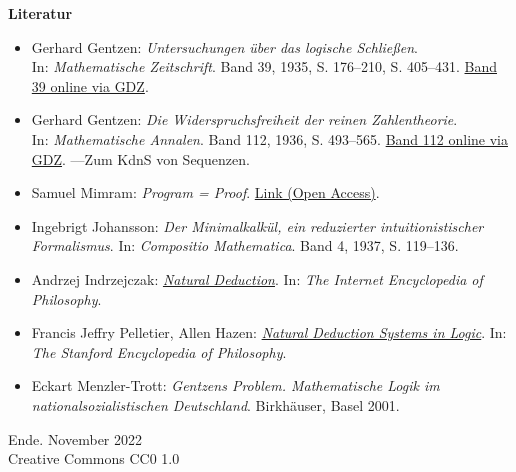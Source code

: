 \documentclass[8pt]{beamer}
\newcommand{\modest}[1]{{\small\color{gray}#1}}
\newcommand{\strong}[1]{\textsf{\textbf{#1}}}
\begin{document}
\begin{frame}[t]
\vspace{2em}
\strong{Literatur}
\begin{itemize}
\item Gerhard Gentzen: \emph{Untersuchungen über das logische Schließen}.\\
In: \emph{Mathematische Zeitschrift}. Band 39, 1935, S. 176--210, S. 405--431.
\href{https://gdz.sub.uni-goettingen.de/id/PPN266833020_0039}{Band 39 online via GDZ}.
\item Gerhard Gentzen: \emph{Die Widerspruchsfreiheit der reinen
Zahlentheorie}.\\
In: \emph{Mathematische Annalen}. Band 112, 1936, S. 493--565.
\href{https://gdz.sub.uni-goettingen.de/id/PPN235181684_0112}{Band 112 online via GDZ}.
---Zum KdnS von Sequenzen.
\item Samuel Mimram: \emph{Program = Proof}.
\href{https://www.lix.polytechnique.fr/Labo/Samuel.Mimram/publications/}{Link (Open Access)}.
\item Ingebrigt Johansson: \emph{Der Minimalkalkül, ein reduzierter
intuitionistischer Formalismus}. In: \emph{Compositio Mathematica}.
Band 4, 1937, S. 119--136.
\item Andrzej Indrzejczak: \href{https://iep.utm.edu/natural-deduction/}{\emph{Natural Deduction}}.
In: \emph{The Internet Encyclopedia of Philosophy}.
\item Francis Jeffry Pelletier, Allen Hazen:
\href{https://plato.stanford.edu/entries/natural-deduction/}{\emph{Natural Deduction Systems in Logic}}.
In: \emph{The Stanford Encyclopedia of Philosophy}.
\item Eckart Menzler-Trott: \emph{Gentzens Problem. Mathematische Logik
  im nationalsozialistischen Deutschland}. Birkhäuser, Basel 2001.
\end{itemize}
\end{frame}

\begin{frame}
Ende.
\vfill\hfill\modest{November 2022}\\
\hfill\modest{Creative Commons CC0 1.0}
\end{frame}
\end{document}
